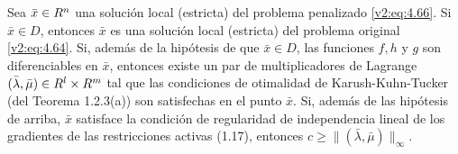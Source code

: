 \begin{theorem}\label{v2:thm:4.3.4}
    Sea $\bar{x} \in R^n$ una solución local (estricta) del problema penalizado \eqref{v2:eq:4.66}.
    Si $\bar{x} \in D$, entonces $\bar{x}$ es una solución local (estricta) del problema original \eqref{v2:eq:4.64}.
    Si, además de la hipótesis de que $\bar{x} \in D$, las funciones $f, h$ y $g$ son diferenciables en $\bar{x}$, entonces existe un par de multiplicadores de Lagrange $(\bar{\lambda}, \bar{\mu}) \in R^l \times R^m$ tal que las condiciones de otimalidad de Karush-Kuhn-Tucker (del Teorema 1.2.3(a)) son satisfechas en el punto $\bar{x}$.
    Si, además de las hipótesis de arriba, $\bar{x}$ satisface la condición de regularidad de independencia lineal de los gradientes de las restricciones activas (1.17), entonces $c \ge \|(\bar{\lambda}, \bar{\mu})\|_\infty$.
\end{theorem}
